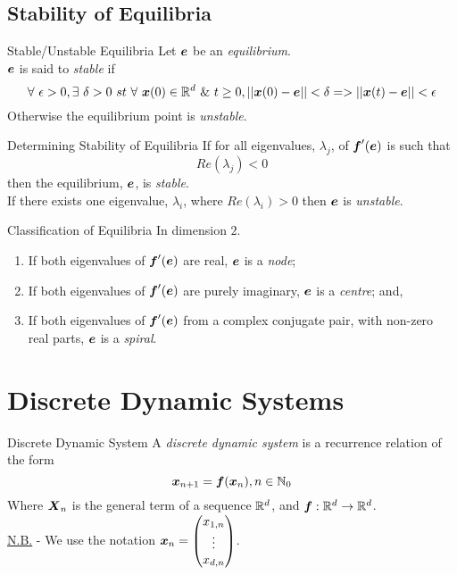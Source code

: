\documentclass[11pt,a4paper]{article}
\begin{document}
\subsection{Stability of Equilibria}

\subtitle{Definition 16.04 - }{Stable/Unstable Equilibria}
Let $\boldsymbol{e}$ be an \textit{equilibrium}.\\
$\boldsymbol{e}$ is said to \textit{stable} if
$$\forall\ \epsilon > 0, \exists\ \delta > 0\ st\ \forall\ \vect{x}(0) \in \real^d\ \&\ t \geq 0, ||\vect{x}(0) - \vect{e}|| < \delta => ||\vect{x}(t) - \vect{e}|| < \epsilon$$
Otherwise the equilibrium point is \textit{unstable}.\\

\subtitle{Theorem 16.05 - }{Determining Stability of Equilibria}
If for all eigenvalues, $\lambda_j$, of $\boldsymbol{f}'(\boldsymbol{e})$ is such that
$$Re(\lambda_j) < 0$$
then the equilibrium, $\boldsymbol{e}$, is \textit{stable}.\\
If there exists one eigenvalue, $\lambda_i$, where $Re(\lambda_i) > 0$ then $\boldsymbol{e}$ is \textit{unstable}.\\

\subtitle{Definition 16.06 - }{Classification of Equilibria}
In dimension $2$.
\begin{enumerate}[label=\roman*)]
  \item If both eigenvalues of $\boldsymbol{f}'(\boldsymbol{e})$ are real, $\boldsymbol{e}$ is a \textit{node};
  \item If both eigenvalues of $\boldsymbol{f}'(\boldsymbol{e})$ are purely imaginary, $\boldsymbol{e}$ is a \textit{centre}; and,
  \item If both eigenvalues of $\boldsymbol{f}'(\boldsymbol{e})$ from a complex conjugate pair, with non-zero real parts, $\boldsymbol{e}$ is a \textit{spiral}.
\end{enumerate}

\section{Discrete Dynamic Systems}

\subtitle{Definition 17.01 - }{Discrete Dynamic System}
A \textit{discrete dynamic system} is a recurrence relation of the form
$$\boldsymbol{x}_{n+1} = \boldsymbol{f}(\boldsymbol{x}_n), n \in \mathbb{N}_0$$
Where $\boldsymbol{X}_n$ is the general term of a sequence $\mathbb{R}^d$, and $\boldsymbol{f} : \mathbb{R}^d \to \mathbb{R}^d$.\\
\underline{N.B.} - We use the notation $\boldsymbol{x}_n = \begin{pmatrix} x_{1, n} \\ \vdots \\ x_{d, n}\end{pmatrix}$.\\
\end{document}
